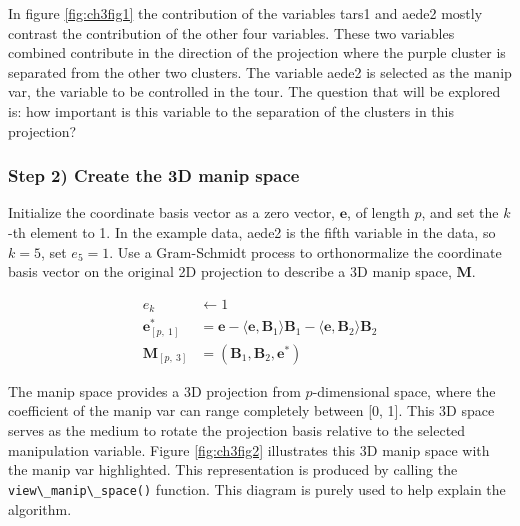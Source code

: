 \documentclass{monashthesis}
\begin{document}
In figure \ref{fig:ch3fig1} the contribution of the variables tars1 and aede2 mostly contrast the contribution of the other four variables. These two variables combined contribute in the direction of the projection where the purple cluster is separated from the other two clusters. The variable aede2 is selected as the manip var, the variable to be controlled in the tour. The question that will be explored is: how important is this variable to the separation of the clusters in this projection?

\hypertarget{step-2-create-the-3d-manip-space}{%
\subsubsection{Step 2) Create the 3D manip space}\label{step-2-create-the-3d-manip-space}}

Initialize the coordinate basis vector as a zero vector, \(\textbf{e}\), of length \(p\), and set the \(k\)-th element to 1. In the example data, aede2 is the fifth variable in the data, so \(k=5\), set \(e_5=1\). Use a Gram-Schmidt process to orthonormalize the coordinate basis vector on the original 2D projection to describe a 3D manip space, \(\textbf{M}\).

\begin{align*}
  e_k &\leftarrow 1 \\ 
  \textbf{e}^*_{[p,~1]} &= \textbf{e} - \langle \textbf{e}, \textbf{B}_1 \rangle \textbf{B}_1 - \langle \textbf{e}, \textbf{B}_2 \rangle \textbf{B}_2 \\ 
  \textbf{M}_{[p,~3]} &= (\textbf{B}_1,\textbf{B}_2,\textbf{e}^*)
\end{align*}

The manip space provides a 3D projection from \(p\)-dimensional space, where the coefficient of the manip var can range completely between {[}0, 1{]}. This 3D space serves as the medium to rotate the projection basis relative to the selected manipulation variable. Figure \ref{fig:ch3fig2} illustrates this 3D manip space with the manip var highlighted. This representation is produced by calling the \texttt{view\textbackslash{}\_manip\textbackslash{}\_space()} function. This diagram is purely used to help explain the algorithm.
\end{document}
